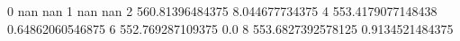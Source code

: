 0 nan nan
1 nan nan
2 560.81396484375 8.044677734375
4 553.4179077148438 0.64862060546875
6 552.769287109375 0.0
8 553.6827392578125 0.9134521484375
